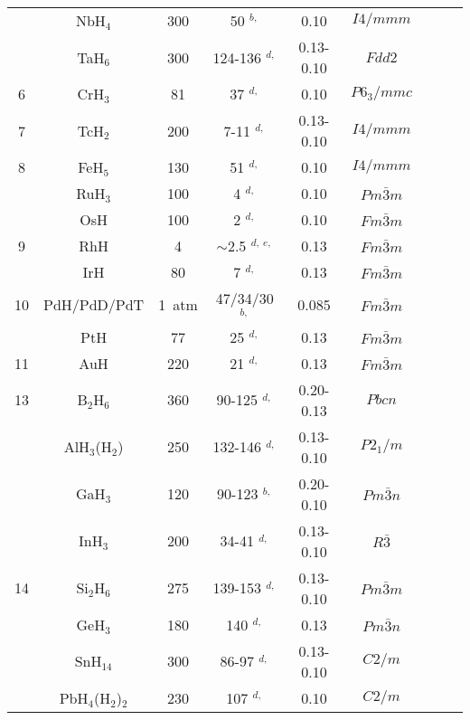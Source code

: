 \documentclass[12pt,letterpaper,oneside]{article}
\begin{document}
\begin{longtable}{ccccccccc}
      & NbH$_{4}$    & 300 & 50 $^{b,}$ \cite{Durajski:2014b} & 0.10 & $I4/mmm$ \\
      & TaH$_{6}$    & 300 & 124-136 $^{d,}$ \cite{Zhuang:2017a} & 0.13-0.10 & $Fdd2$ \\
\hline
6     & CrH$_{3}$    & 81 & 37 $^{d,}$ \cite{Yu:2015} & 0.10 & $P6_{3}/mmc$ \\
\hline
7     & TcH$_{2}$    & 200 & 7-11 $^{d,}$ \cite{Li:2016} & 0.13-0.10 & $I4/mmm$ \\
\hline
8     & FeH$_{5}$    & 130 & 51 $^{d,}$ \cite{Majumdar:2017a} & 0.10 & $I4/mmm$ \\
      & RuH$_{3}$    & 100 & 4 $^{d,}$ \cite{Liu:2015c} & 0.10 & $Pm\bar{3}m$ \\
      & OsH & 100    & 2 $^{d,}$ \cite{Liu:2015b} & 0.10 & $Fm\bar{3}m$ \\
\hline
9     & RhH          &  4  & $\sim$2.5 $^{d,~e,}$ \cite{Kim:2011a} & 0.13 & $Fm\bar{3}m$  \\
      & IrH          &  80  & 7 $^{d,}$ \cite{Kim:2011a} & 0.13 & $Fm\bar{3}m$  \\
\hline
10    & PdH/PdD/PdT  & 1~atm & 47/34/30 $^{b,}$ \cite{Errea:2013} & 0.085 & $Fm\bar{3}m$   \\
      & PtH          & 77  & 25 $^{d,}$ \cite{Kim:2011a} & 0.13 & $Fm\bar{3}m$  \\
\hline     
11    & AuH          &  220  & 21 $^{d,}$ \cite{Kim:2011a}  & 0.13  & $Fm\bar{3}m$ \\
\hline
13    & B$_{2}$H$_{6}$       & 360 & 90-125 $^{d,}$ \cite{Abe:2011a} & 0.20-0.13 & $Pbcn$ \\
      & AlH$_{3}$(H$_2$)     & 250 & 132-146 $^{d,}$ \cite{Hou:2015-Al} & 0.13-0.10 & $P2_{1}/m$ \\
      & GaH$_{3}$            & 120 & 90-123 $^{b,}$ \cite{Szczesniak:2014} & 0.20-0.10 & $Pm\bar{3}n$ \\
      & InH$_{3}$            & 200 & 34-41 $^{d,}$ \cite{Liu:2015a} & 0.13-0.10 & $R\bar{3}$ \\
\hline
14      & Si$_{2}$H$_{6}$    & 275 & 139-153 $^{d,}$ \cite{Jin:2010-Si} & 0.13-0.10 & $Pm\bar{3}m$ \\
      & GeH$_{3}$            & 180 & 140 $^{d,}$ \cite{Abe:2013-Ge} & 0.13 & $Pm\bar{3}n$ \\
      & SnH$_{14}$           & 300 & 86-97 $^{d,}$ \cite{Esfahani:2016} & 0.13-0.10 & $C2/m$ \\
      & PbH$_{4}$(H$_2$)$_2$ & 230 & 107 $^{d,}$ \cite{Cheng:2015} & 0.10 & $C2/m$ \\

\end{longtable}
\end{document}
